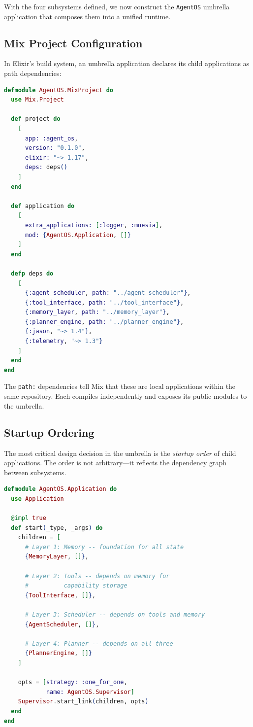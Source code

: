 \documentclass[12pt,a4paper]{article}
\theoremstyle{definition}
\begin{document}
With the four subsystems defined, we now construct the \texttt{AgentOS}
umbrella application that composes them into a unified runtime.

\subsection{Mix Project Configuration}

In Elixir's build system, an umbrella application declares its child
applications as path dependencies:

\begin{lstlisting}[language=elixir, caption={mix.exs for the AgentOS umbrella}]
defmodule AgentOS.MixProject do
  use Mix.Project

  def project do
    [
      app: :agent_os,
      version: "0.1.0",
      elixir: "~> 1.17",
      deps: deps()
    ]
  end

  def application do
    [
      extra_applications: [:logger, :mnesia],
      mod: {AgentOS.Application, []}
    ]
  end

  defp deps do
    [
      {:agent_scheduler, path: "../agent_scheduler"},
      {:tool_interface, path: "../tool_interface"},
      {:memory_layer, path: "../memory_layer"},
      {:planner_engine, path: "../planner_engine"},
      {:jason, "~> 1.4"},
      {:telemetry, "~> 1.3"}
    ]
  end
end
\end{lstlisting}

The \texttt{path:} dependencies tell Mix that these are local applications
within the same repository. Each compiles independently and exposes its
public modules to the umbrella.

\subsection{Startup Ordering}\label{subsec:startup}

The most critical design decision in the umbrella is the \emph{startup order}
of child applications. The order is not arbitrary---it reflects the dependency
graph between subsystems.

\begin{lstlisting}[language=elixir, caption={AgentOS.Application: ordered supervision tree}]
defmodule AgentOS.Application do
  use Application

  @impl true
  def start(_type, _args) do
    children = [
      # Layer 1: Memory -- foundation for all state
      {MemoryLayer, []},

      # Layer 2: Tools -- depends on memory for
      #          capability storage
      {ToolInterface, []},

      # Layer 3: Scheduler -- depends on tools and memory
      {AgentScheduler, []},

      # Layer 4: Planner -- depends on all three
      {PlannerEngine, []}
    ]

    opts = [strategy: :one_for_one,
            name: AgentOS.Supervisor]
    Supervisor.start_link(children, opts)
  end
end
\end{lstlisting}
\end{document}
